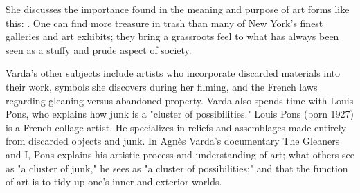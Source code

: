She discusses the importance found in the meaning and purpose of art forms like this:  \cite{cruickshank2007work}. One can find more treasure in trash than many of New York’s finest galleries and art exhibits; they bring a grassroots feel to what has always been seen as a stuffy and prude aspect of society.

Varda's other subjects include artists who incorporate discarded materials into their work, symbols she discovers during her filming, and the French laws regarding gleaning versus abandoned property. Varda also spends time with Louis Pons, who explains how junk is a "cluster of possibilities." Louis Pons (born 1927) is a French collage artist. He specializes in reliefs and assemblages made entirely from discarded objects and junk. In Agnès Varda's documentary The Gleaners and I, Pons explains his artistic process and understanding of art; what others see as "a cluster of junk," he sees as "a cluster of possibilities;" and that the function of art is to tidy up one's inner and exterior worlds.










